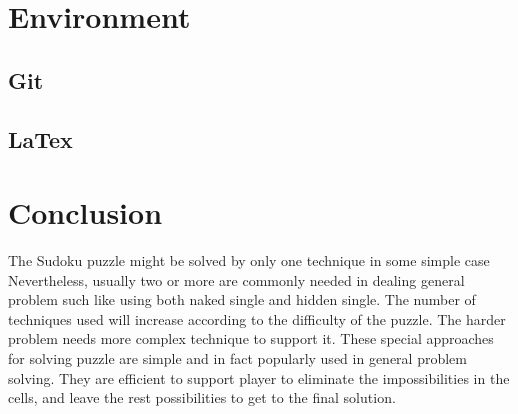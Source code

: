 \documentclass[11pt]{report}
\begin{document}
\chapter{Environment}
\label{sec:Environment}

\section{Git}
\label{sec:git}


\section{LaTex}
\label{sec:miktex}


\chapter{Conclusion}
\label{sec:Conclusion}
The Sudoku puzzle might be solved by only one technique in some simple case Nevertheless, usually two or more are commonly needed in dealing general problem such like using both naked single and hidden single. The number of techniques used will increase according to the difficulty of the puzzle. The harder problem needs more complex technique to support it.
These special approaches for solving puzzle are simple and in fact popularly used in general problem solving. They are efficient to support player to eliminate the impossibilities in the cells, and leave the rest possibilities to get to the final solution.





\end{document}
